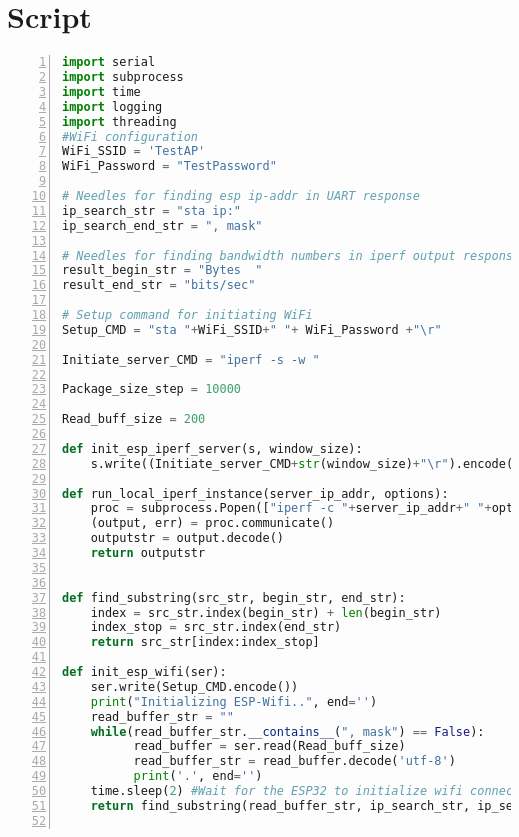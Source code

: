 \documentclass[../DCM2_Verslag.tex]{subfiles}
\begin{document}
\section{Script}
\begin{lstlisting}[commentstyle=\color{codegreen},
    keywordstyle=\color{magenta},
    numberstyle=\tiny\color{codegray},
    stringstyle=\color{codepurple},
    basicstyle=\ttfamily\footnotesize,
    breakatwhitespace=false,         
    breaklines=true,                 
    captionpos=b,                    
    keepspaces=true,                 
    numbers=left,                    
    numbersep=5pt,                  
    showspaces=false,                
    showstringspaces=false,
    showtabs=false, language=Python]
import serial
import subprocess
import time
import logging
import threading
#WiFi configuration
WiFi_SSID = 'TestAP'
WiFi_Password = "TestPassword"

# Needles for finding esp ip-addr in UART response
ip_search_str = "sta ip:"
ip_search_end_str = ", mask"

# Needles for finding bandwidth numbers in iperf output response
result_begin_str = "Bytes  "
result_end_str = "bits/sec"

# Setup command for initiating WiFi
Setup_CMD = "sta "+WiFi_SSID+" "+ WiFi_Password +"\r"

Initiate_server_CMD = "iperf -s -w "

Package_size_step = 10000

Read_buff_size = 200

def init_esp_iperf_server(s, window_size):
    s.write((Initiate_server_CMD+str(window_size)+"\r").encode())

def run_local_iperf_instance(server_ip_addr, options):
    proc = subprocess.Popen(["iperf -c "+server_ip_addr+" "+options], stdout=subprocess.PIPE, shell=True)
    (output, err) = proc.communicate()
    outputstr = output.decode()
    return outputstr


def find_substring(src_str, begin_str, end_str):
    index = src_str.index(begin_str) + len(begin_str)
    index_stop = src_str.index(end_str)
    return src_str[index:index_stop]
    
def init_esp_wifi(ser):
    ser.write(Setup_CMD.encode())
    print("Initializing ESP-Wifi..", end='')
    read_buffer_str = ""
    while(read_buffer_str.__contains__(", mask") == False):
          read_buffer = ser.read(Read_buff_size)
          read_buffer_str = read_buffer.decode('utf-8')
          print('.', end='')
    time.sleep(2) #Wait for the ESP32 to initialize wifi connection, takes approximately 2 secs
    return find_substring(read_buffer_str, ip_search_str, ip_search_end_str)     
       

\end{lstlisting}
\end{document}
